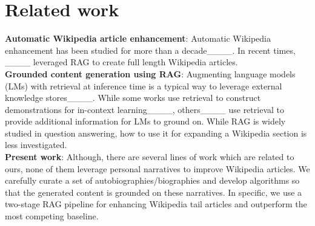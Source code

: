\section{Related work}
\label{sec:related_work}
\noindent \textbf{Automatic Wikipedia article enhancement}: Automatic Wikipedia enhancement has been studied for more than a decade____. In recent times, ____ leveraged RAG to create full length Wikipedia articles.\\ %
\noindent\textbf{Grounded content generation using RAG}: Augmenting language models (LMs) with retrieval at inference time is a typical way to leverage external knowledge stores____. While some works use retrieval to construct demonstrations for in-context learning____, others____ use retrieval to provide additional information for LMs to ground on.
While RAG is widely studied in question answering, how to use it for expanding a Wikipedia section is less investigated.\\
\noindent \textbf{Present work}: Although, there are several lines of work which are related to ours, none of them leverage personal narratives to improve Wikipedia articles. We carefully curate a set of autobiographies/biographies and develop algorithms so that the generated content is grounded on these narratives. In specific, we use a two-stage RAG pipeline for enhancing Wikipedia tail articles and outperform the most competing baseline.


